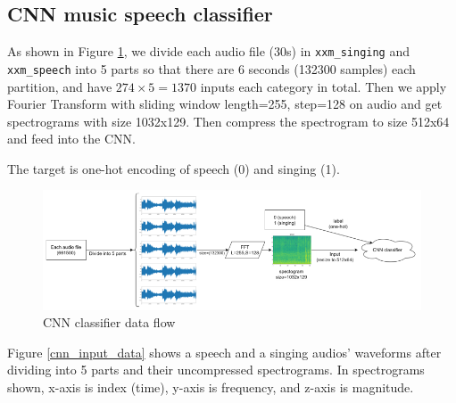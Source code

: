 \documentclass{article}
\begin{document}
    \subsection{CNN music speech classifier}
    As shown in Figure \ref{cnn_bd}, we divide each audio file (30s) in \lstinline|xxm_singing| and \lstinline|xxm_speech| into 5 parts so that there are 6 seconds (132300 samples) each partition, and have $274 \times 5=1370$ inputs each category in total. Then we apply Fourier Transform with sliding window length=255, step=128 on audio and get spectrograms with size 1032x129. Then compress the spectrogram to size 512x64 and feed into the CNN. 

    The target is one-hot encoding of speech (0) and singing (1).
    \begin{figure}[H]
        \includegraphics[width=\linewidth]{figures/cnn_bd.png}
        \caption{CNN classifier data flow}
        \label{cnn_bd}
    \end{figure}
    Figure \ref{cnn_input_data} shows a speech and a singing audios' waveforms after dividing into 5 parts and their uncompressed spectrograms. In spectrograms shown, x-axis is index (time), y-axis is frequency, and z-axis is magnitude. 
\end{document}
